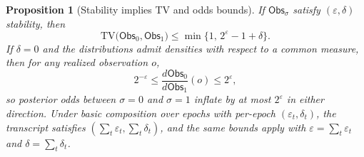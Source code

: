 \documentclass[11pt]{article}
\newtheorem{proposition}{Proposition}
\newcommand{\TV}{\mathrm{TV}}
\begin{document}
\begin{proposition}[Stability implies TV and odds bounds]
\label{prop:dp-to-tv-odds}
If $\mathsf{Obs}_\sigma$ satisfy $(\varepsilon,\delta)$ stability, then
\[
\TV\big(\mathsf{Obs}_0,\mathsf{Obs}_1\big) \le \min\{1,\,2^{\varepsilon}-1+\delta\}.
\]
If $\delta=0$ and the distributions admit densities with respect to a common measure, then for any realized observation $o$,
\[
2^{-\varepsilon} \le \frac{d\mathsf{Obs}_0}{d\mathsf{Obs}_1}(o) \le 2^{\varepsilon},
\]
so posterior odds between $\sigma=0$ and $\sigma=1$ inflate by at most $2^{\varepsilon}$ in either direction.
Under basic composition over epochs with per-epoch $(\varepsilon_t,\delta_t)$, the transcript satisfies $(\sum_t \varepsilon_t,\sum_t \delta_t)$, and the same bounds apply with $\varepsilon=\sum_t\varepsilon_t$ and $\delta=\sum_t\delta_t$.
\end{proposition}
\end{document}
